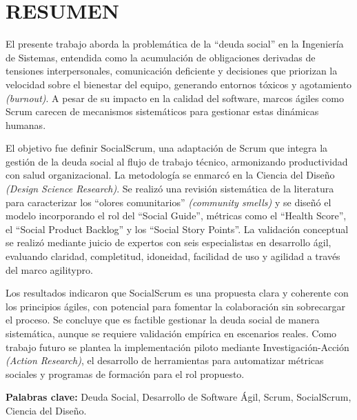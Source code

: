 \clearpage
\chapter*{RESUMEN}

El presente trabajo aborda la problemática de la ``deuda social'' en la Ingeniería de Sistemas, entendida como la acumulación de obligaciones derivadas de tensiones interpersonales, comunicación deficiente y decisiones que priorizan la velocidad sobre el bienestar del equipo, generando entornos tóxicos y agotamiento \textit{(burnout)}. A pesar de su impacto en la calidad del software, marcos ágiles como Scrum carecen de mecanismos sistemáticos para gestionar estas dinámicas humanas.

El objetivo fue definir SocialScrum, una adaptación de Scrum que integra la gestión de la deuda social al flujo de trabajo técnico, armonizando productividad con salud organizacional. La metodología se enmarcó en la Ciencia del Diseño \textit{(Design Science Research)}. Se realizó una revisión sistemática de la literatura para caracterizar los ``olores comunitarios'' \textit{(community smells)} y se diseñó el modelo incorporando el rol del ``Social Guide'', métricas como el ``Health Score'', el ``Social Product Backlog'' y los ``Social Story Points''. La validación conceptual se realizó mediante juicio de expertos con seis especialistas en desarrollo ágil, evaluando claridad, completitud, idoneidad, facilidad de uso y agilidad a través del marco \gls{agilitypro}.

Los resultados indicaron que SocialScrum es una propuesta clara y coherente con los principios ágiles, con potencial para fomentar la colaboración sin sobrecargar el proceso. Se concluye que es factible gestionar la deuda social de manera sistemática, aunque se requiere validación empírica en escenarios reales. Como trabajo futuro se plantea la implementación piloto mediante Investigación-Acción \textit{(Action Research)}, el desarrollo de herramientas para automatizar métricas sociales y programas de formación para el rol propuesto.

\textbf{Palabras clave:} Deuda Social, Desarrollo de Software Ágil, Scrum, SocialScrum, Ciencia del Diseño.